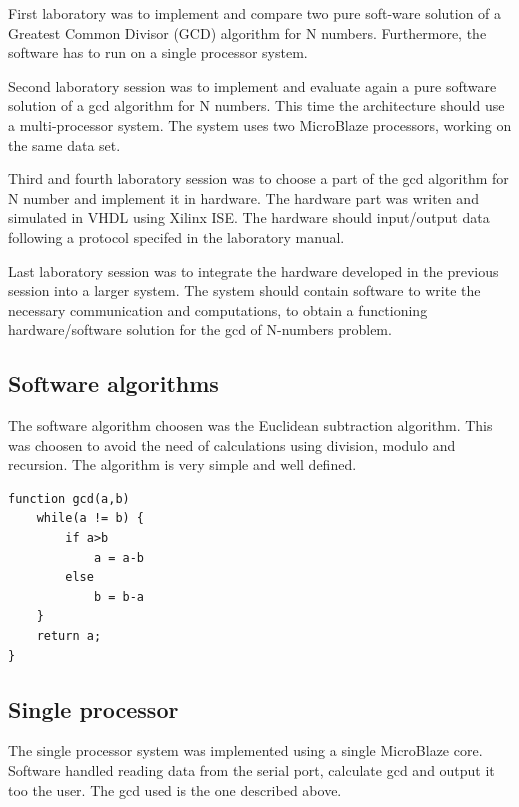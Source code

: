 \documentclass[11pt]{article}
\begin{document}

First laboratory was to implement and compare two pure soft-ware solution of a Greatest Common Divisor (GCD) algorithm for N numbers. Furthermore, the software has to run on a single processor system.

Second laboratory session was to implement and evaluate again a pure software solution of a gcd algorithm for N numbers. This time the architecture should use a multi-processor system. The system uses two MicroBlaze processors, working on the same data set.

Third and fourth  laboratory session was to choose a part of the gcd algorithm for N number and implement it in hardware. The hardware part was writen and simulated in VHDL using Xilinx ISE.  The hardware should input/output data following a protocol specifed in the laboratory manual.

Last laboratory session was to integrate the hardware developed in the previous session into a larger system. The system should contain software to write the necessary communication and computations, to obtain a functioning hardware/software solution for the gcd of N-numbers problem.

\subsection{Software algorithms}
The software algorithm choosen was the Euclidean subtraction algorithm. This was choosen to avoid the need of calculations using division, modulo and recursion. The algorithm is very simple and well defined. 
\begin{lstlisting}[float=tbh,frame=tb,captionpos=b,caption={Working on your report},label=lst:example]
function gcd(a,b)
	while(a != b) {
		if a>b
			a = a-b
		else
			b = b-a
	}
	return a;
}
\end{lstlisting}

\subsection{Single processor}
The single processor system was implemented using a single MicroBlaze core. Software handled reading data from the serial port, calculate gcd and output it too the user. The gcd used is the one described above.
\end{document}
